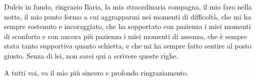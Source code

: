 \documentclass[
    blacklinks,
    libertine,
]{uninathesis}
\theoremstyle{plain}
\theoremstyle{definition}
\theoremstyle{remark}
\begin{document}
    Dulcis in fundo, ringrazio Ilaria, la mia straordinaria compagna, il mio faro nella notte, il mio punto fermo a cui aggrapparmi nei momenti di difficoltà, che mi ha sempre sostenuto e incoraggiato, che ha sopportato con pazienza i miei momenti di sconforto e con ancora più pazienza i miei momenti di assenza, che è sempre stata tanto supportiva quanto schietta, e che mi ha sempre fatto sentire al posto giusto.
    Senza di lei, non sarei qui a scrivere queste righe.

    A tutti voi, va il mio più sincero e profondo ringraziamento.
\end{document}
